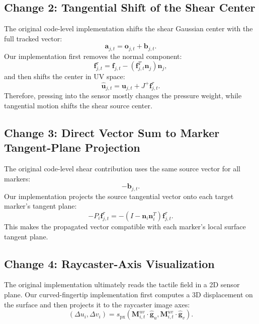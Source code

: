 \documentclass[11pt]{article}
\begin{document}
\subsection{Change 2: Tangential Shift of the Shear Center}

The original code-level implementation shifts the shear Gaussian center with
the full tracked vector:
\begin{equation}
    \mathbf{a}_{j,t}
    =
    \mathbf{o}_{j,t}
    +
    \mathbf{b}_{j,t}.
\end{equation}
Our implementation first removes the normal component:
\begin{equation}
    \mathbf{f}^{\tau}_{j,t}
    =
    \mathbf{f}_{j,t}
    -
    (\mathbf{f}_{j,t}^T\mathbf{n}_j)\mathbf{n}_j,
\end{equation}
and then shifts the center in UV space:
\begin{equation}
    \hat{\mathbf{u}}_{j,t}
    =
    \mathbf{u}_{j,t}
    +
    J^+
    \mathbf{f}^{\tau}_{j,t}.
\end{equation}
Therefore, pressing into the sensor mostly changes the pressure weight, while
tangential motion shifts the shear source center.

\subsection{Change 3: Direct Vector Sum to Marker Tangent-Plane Projection}

The original code-level shear contribution uses the same source vector for all
markers:
\begin{equation}
    -\mathbf{b}_{j,t}.
\end{equation}
Our implementation projects the source tangential vector onto each target
marker's tangent plane:
\begin{equation}
    -P_i\mathbf{f}^{\tau}_{j,t}
    =
    -
    (I-\mathbf{n}_i\mathbf{n}_i^T)
    \mathbf{f}^{\tau}_{j,t}.
\end{equation}
This makes the propagated vector compatible with each marker's local surface
tangent plane.

\subsection{Change 4: Raycaster-Axis Visualization}

The original implementation ultimately reads the tactile field in a 2D sensor
plane. Our curved-fingertip implementation first computes a 3D displacement on
the surface and then projects it to the raycaster image axes:
\begin{equation}
    (\Delta u_i,\Delta v_i)
    =
    s_{\mathrm{px}}
    \left(
        \mathbf{M}^{uv}_{i,t}\cdot\hat{\mathbf{g}}_u,
        \mathbf{M}^{uv}_{i,t}\cdot\hat{\mathbf{g}}_v
    \right).
\end{equation}
\end{document}
